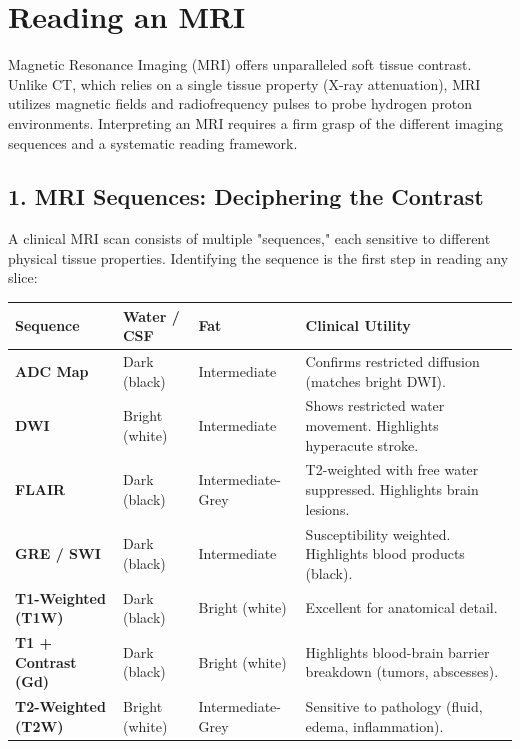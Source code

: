 \chapter{Reading an MRI}

\label{ch:read_mri}

Magnetic Resonance Imaging (MRI) offers unparalleled soft tissue contrast. Unlike CT, which relies on a single tissue property (X-ray attenuation), MRI utilizes magnetic fields and radiofrequency pulses to probe hydrogen proton environments. Interpreting an MRI requires a firm grasp of the different imaging sequences and a systematic reading framework.


\section*{1. MRI Sequences: Deciphering the Contrast}
A clinical MRI scan consists of multiple "sequences," each sensitive to different physical tissue properties. Identifying the sequence is the first step in reading any slice:

\begin{center}
\begin{longtable}{@{}p{}p{}p{}p{}@{}}
\toprule
\textbf{Sequence} & \textbf{Water / CSF} & \textbf{Fat} & \textbf{Clinical Utility} \\
\midrule
\textbf{ADC Map} & Dark (black) & Intermediate & Confirms restricted diffusion (matches bright DWI). \\
\textbf{DWI} & Bright (white) & Intermediate & Shows restricted water movement. Highlights hyperacute stroke. \\
\textbf{FLAIR} & Dark (black) & Intermediate-Grey & T2-weighted with free water suppressed. Highlights brain lesions. \\
\textbf{GRE / SWI} & Dark (black) & Intermediate & Susceptibility weighted. Highlights blood products (black). \\
\textbf{T1-Weighted (T1W)} & Dark (black) & Bright (white) & Excellent for anatomical detail. \\
\textbf{T1 + Contrast (Gd)} & Dark (black) & Bright (white) & Highlights blood-brain barrier breakdown (tumors, abscesses). \\
\textbf{T2-Weighted (T2W)} & Bright (white) & Intermediate-Grey & Sensitive to pathology (fluid, edema, inflammation). \\
\bottomrule
\end{longtable}
\end{center}

